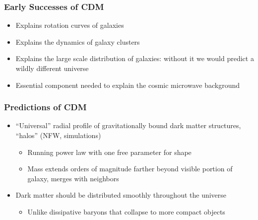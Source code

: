 \documentclass{beamer}
\begin{document}
\frame
{
    \frametitle{Early Successes of CDM}

 
    \begin{itemize}

        \item Explains rotation curves of galaxies

        \item Explains the dynamics of galaxy clusters

        \item Explains the large scale distribution of galaxies: without it we
          would predict a wildly different universe

        \item Essential component needed to explain the cosmic microwave
          background

    \end{itemize}

}

\frame
{
    \frametitle{Predictions of CDM}

 
    \begin{itemize}

        \item  ``Universal'' radial profile of gravitationally bound dark matter
            structures, ``halos'' (NFW, simulations)
            \begin{itemize}
                \item Running power law with one free parameter for shape
                \item Mass extends orders of magnitude farther beyond visible portion of galaxy,
                    merges with neighbors
            \end{itemize}


        \item  Dark matter should be distributed smoothly throughout the
            universe
            \begin{itemize}
                \item Unlike dissipative baryons that collapse to more compact objects
            \end{itemize}

    \end{itemize}

}
\end{document}
